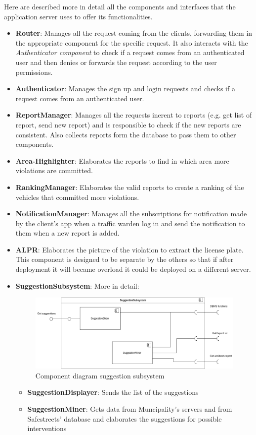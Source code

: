 \documentclass{article}
\begin{document}
Here are described more in detail all the components and interfaces that
the application server uses to offer its functionalities.
\begin{itemize}
	\item \textbf{Router}: Manages all the request coming from the clients, forwarding them in the appropriate component for the specific request. 
	It also interacts with the \textit{Authenticator component} to check if a request comes from an authenticated user and then denies or forwards the request according to the user permissions.
	\item \textbf{Authenticator}: Manages the sign up and login requests and checks if a request comes from an authenticated user.
	\item \textbf{ReportManager}: Manages all the requests inerent to reports (e.g. get list of report, send new report) and is responsible to check if the new reports are consistent. Also collects reports form the database to pass them to other components.
	\item \textbf{Area-Highlighter}: Elaborates the reports to find in which area more violations are committed.
	\item \textbf{RankingManager}: Elaborates the valid reports to create a ranking of the vehicles that committed more violations.
	\item \textbf{NotificationManager}: Manages all the subscriptions for notification made by the client's app when a traffic warden log in and send the notification to them when a new report is added.
	\item \textbf{ALPR}: Elaborates the picture of the violation to extract the license plate. This component is designed to be separate by the others so that if after deployment it will became overload it could be deployed on a different server.
	\item \textbf{SuggestionSubsystem}: More in detail:
		\\
\begin{figure}[h!]
\centering
	\includegraphics[width=1.0\textwidth]{images/SuggestionSubsystem-components-diagram.png}
	\caption{Component diagram suggestion subsystem}
	\label{fig:component-suggestion-subsystem}
\end{figure}
\begin{itemize}
	\item \textbf{SuggestionDisplayer}: Sends the list of the suggestions
	\item \textbf{SuggestionMiner}: Gets data from Muncipality's servers and from Safestreets' database and elaborates the suggestions for possible interventions
\end{itemize}
\end{itemize}
\end{document}
